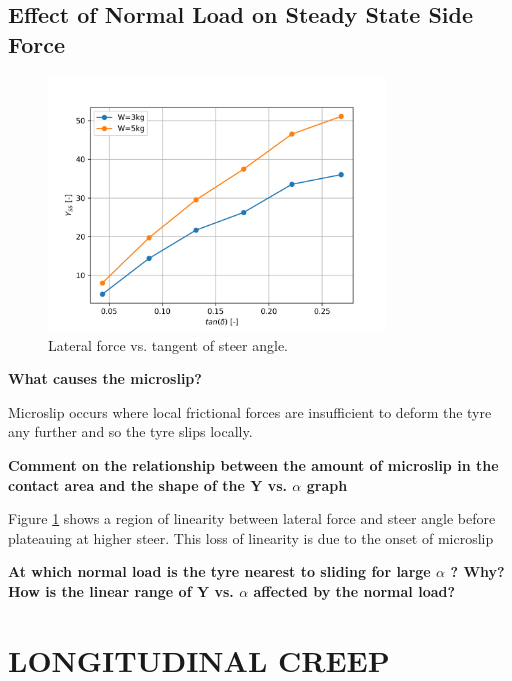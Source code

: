 \documentclass{article}
\begin{document}
\subsection{\textbf{Effect of Normal Load on Steady State Side Force}}

\begin{figure}[H]
    \centering
    \includegraphics[width=0.8\textwidth]{4.3/Yss_vs_tandelta.png}
    \caption{Lateral force vs. tangent of steer angle.}
    \label{fig:Y_vs_alpha}
\end{figure}

\begin{center}
    \textbf{What causes the microslip?}
\end{center}
Microslip occurs where local frictional forces are insufficient to deform the tyre any further and so the tyre slips locally.

\begin{center}
    \textbf{Comment on the relationship between the amount of microslip in the contact area and
    the shape of the Y vs. $ \alpha $ graph}
\end{center}

Figure \ref{fig:Y_vs_alpha} shows a region of linearity between lateral force and steer angle before plateauing at higher steer.
This loss of linearity is due to the onset of microslip 


\begin{center}
    \textbf{At which normal load is the tyre nearest to sliding for large
    $ \alpha $ ? Why? How is the
    linear range of Y vs.
    $ \alpha $ affected by the normal load?}
\end{center}

\section{LONGITUDINAL CREEP}
\end{document}
